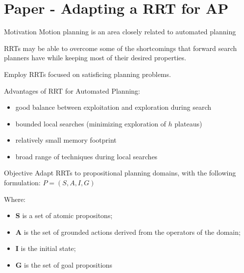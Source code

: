 \documentclass[10pt, xcolor=table]{beamer}
\begin{document}
\section{Paper - Adapting a RRT for AP} %

\begin{frame}{Motivation}
Motion planning is an area closely related to automated planning \cite{alcazar2011adapting}
\vspace{0.5cm}

RRTs may be able to overcome some of the shortcomings that forward search planners have while keeping most of their desired properties.

\vspace{0.5cm}
Employ RRTs focused on satisficing planning problems.
\begin{alertblock}{Advantages of RRT for Automated Planning:}
\begin{itemize}
\item good balance between exploitation and exploration during search
\item bounded local searches (minimizing exploration of $h$ plateaus)
\item relatively small memory footprint
\item broad range of techniques during local searches
\end{itemize}
\end{alertblock}
\end{frame}

\begin{frame}{Objective}
Adapt RRTs to propositional planning domains, with the following formulation: $P=(S,A,I,G)$

Where:
\begin{itemize}
\item \textbf{S} is a set of atomic propositons; 
\item \textbf{A} is the set of grounded actions derived from the operators of the domain;
\item \textbf{I} is the initial state;
\item \textbf{G} is the set of goal propositions
\end{itemize}
\end{frame}
\end{document}
